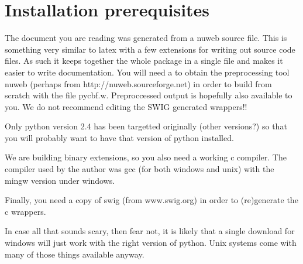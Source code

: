 \documentclass[10pt,a4paper,twoside,notitlepage]{article}
\begin{document}
\section{Installation prerequisites}

The document you are reading was generated from a nuweb source file. This
is something very similar to latex with a few extensions for writing out
source code files. As such it keeps together the whole package in a single file
and makes it easier to write documentation. You will need a to obtain the 
preprocessing tool nuweb (perhaps from http://nuweb.sourceforge.net) in
order to build from scratch with the file pycbf.w. Preproccessed output
is hopefully also available to you. 
We do not recommend editing the SWIG generated wrappers!!

Only python version 2.4 has been targetted originally (other versions?) so
that you will probably want to have that version of python installed.

We are building binary extensions, so you also need a working c compiler. 
The compiler used by the author was gcc (for both windows and unix) with
the mingw version under windows.

Finally, you need a copy of swig (from www.swig.org) in order to (re)generate
the c wrappers. 

In case all that sounds scary, then fear not, it is likely that a single download
for windows will just work with the right version of python. Unix systems
come with many of those things available anyway.
\end{document}
